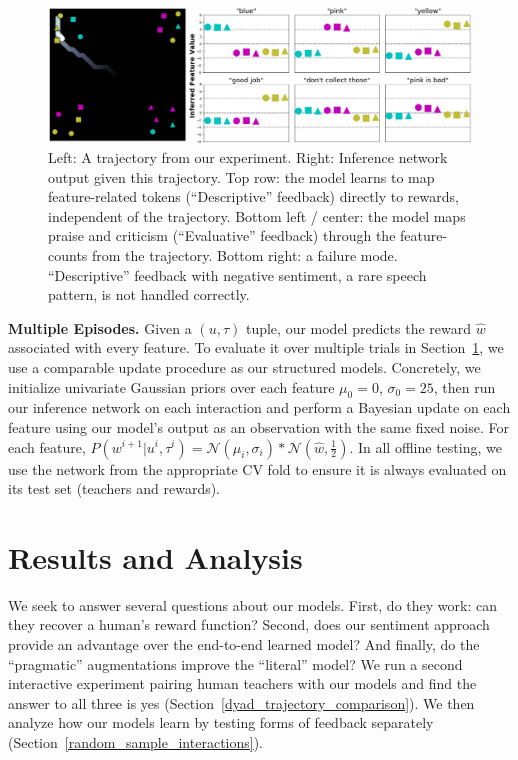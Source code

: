 \documentclass[letterpaper]{article} %
\begin{document}
\begin{figure}[h]
\begin{center}
\includegraphics[width=14cm]{images/neural_net_learning_final.png}
\end{center}
\caption{Left: A trajectory from our experiment. Right: Inference network output given this trajectory. Top row: the model learns to map feature-related tokens (``Descriptive'' feedback) directly to rewards, independent of the trajectory. Bottom left / center: the model maps praise and criticism (``Evaluative'' feedback) through the feature-counts from the trajectory. Bottom right: a failure mode. ``Descriptive'' feedback with negative sentiment, a rare speech pattern, is not handled correctly.}
\label{learned_utterance_targets}
\end{figure}

\textbf{Multiple Episodes.} Given a $(u, \tau)$ tuple, our model predicts the reward $\hat{w}$ associated with every feature. To evaluate it over multiple trials in Section~\ref{results_and_analysis_section}, we use a comparable update procedure as our structured models. Concretely, we initialize univariate Gaussian priors over each feature $\mu_0 = 0$, $\sigma_0 = 25$, then run our inference network on each interaction and perform a Bayesian update on each feature using our model's output as an observation with the same fixed noise. For each feature, $P(w^{i+1} | u^i, \tau^i) = \mathcal{N}(\mu_{i},\sigma_{i}) * \mathcal{N}(\hat{w}, \frac{1}{2})$. In all offline testing, we use the network from the appropriate CV fold to ensure it is always evaluated on its test set (teachers and rewards).

\section{Results and Analysis}
\label{results_and_analysis_section}
We seek to answer several questions about our models. First, do they work: can they recover a human's reward function? Second, does our sentiment approach provide an advantage over the end-to-end learned model? And finally, do the ``pragmatic'' augmentations improve the ``literal'' model? We run a second interactive experiment pairing human teachers with our models and find the answer to all three is yes (Section~\ref{dyad_trajectory_comparison}). We then analyze how our models learn by testing forms of feedback separately (Section~\ref{random_sample_interactions}).
\end{document}
